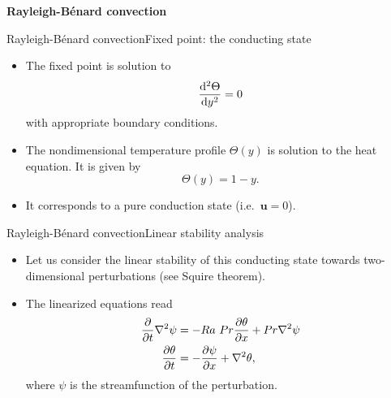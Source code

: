 \documentclass[usenames,dvipsnames,svgnames,10pt,aspectratio=169]{beamer}
\begin{document}
\begin{frame}[t, c]{}
	\centering
	\vspace{1cm}

	{\Large \textbf{Rayleigh-Bénard convection}}

	\bigskip

	{}

\end{frame}

\begin{frame}[t, c]{Rayleigh-Bénard convection}{Fixed point: the conducting state}
	\begin{itemize}
		\item The fixed point is solution to
		\begin{equation}
			\displaystyle \frac{\mathrm{d}^2 \Theta}{\mathrm{d}y^2} = 0
			\notag
		\end{equation}
		with appropriate boundary conditions.

		\bigskip

		\item The nondimensional temperature profile $\Theta(y)$ is solution to the heat equation. It is given by
		$$\Theta (y) = 1 -y.$$

		\bigskip

		\item It corresponds to a pure conduction state (i.e.\ $\bm{u} = 0$).
	\end{itemize}

	\vspace{1cm}
\end{frame}

\begin{frame}[t, c]{Rayleigh-Bénard convection}{Linear stability analysis}
	\begin{itemize}
		\item Let us consider the linear stability of this conducting state towards two-dimensional perturbations (see Squire theorem).

		\bigskip

		\item The linearized equations read
		\begin{equation}
			\begin{aligned}
				\displaystyle \frac{\partial}{\partial t} \nabla^2 \psi & = - Ra\ Pr \frac{\partial \theta}{\partial x} +  Pr \nabla^2 \psi \\
				\displaystyle \frac{\partial \theta}{\partial t} & = - \frac{\partial \psi}{\partial x} + \nabla^2 \theta,
			\end{aligned}
			\notag
		\end{equation}
		where $\psi$ is the streamfunction of the perturbation.
	\end{itemize}

	\vspace{1cm}
\end{frame}
\end{document}
